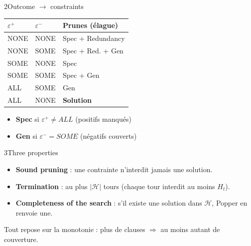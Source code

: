 \documentclass[10pt]{article}
\begin{document}
\begin{minipage}[t]{0.32\textwidth}
\begin{bloc}{\num{2}Outcome $\to$ constraints}
{\scriptsize
\renewcommand{\arraystretch}{1.15}
\begin{tabular}{@{}l l L{2.6cm}@{}}
$\varepsilon^+$ & $\varepsilon^-$ & Prunes (élague)\\\hline
NONE & NONE & Spec + Redundancy\\
NONE & SOME & Spec + Red. + Gen\\
SOME & NONE & Spec\\
SOME & SOME & Spec + Gen\\
ALL & SOME & Gen\\
ALL & NONE & \textbf{Solution}\\
\end{tabular}}
\vspace{2pt}
\begin{itemize}
  \item \textbf{Spec} si $\varepsilon^+\neq\mathit{ALL}$ (positifs manqués)
  \item \textbf{Gen} si $\varepsilon^-=\mathit{SOME}$ (négatifs couverts)
\end{itemize}
\end{bloc}
\end{minipage}\hfill
\begin{minipage}[t]{0.32\textwidth}
\begin{bloc}{\num{3}Three properties}
\begin{itemize}
  \item \textbf{Sound pruning} : une contrainte n'interdit jamais une solution.
  \item \textbf{Termination} : au plus $|\mathcal{H}|$ tours (chaque tour interdit au moins $H_t$).
  \item \textbf{Completeness of the search} : s'il existe une solution dans $\mathcal{H}$, Popper en renvoie une.
\end{itemize}
\begin{astuce}
Tout repose sur la monotonie : plus de clauses $\Rightarrow$ au moins autant de couverture.
\end{astuce}
\end{bloc}
\end{minipage}

\vspace{4pt}
\end{document}
